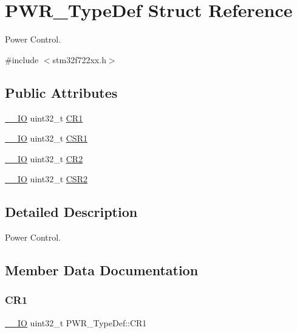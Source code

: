 \hypertarget{struct_p_w_r___type_def}{}\section{P\+W\+R\+\_\+\+Type\+Def Struct Reference}
\label{struct_p_w_r___type_def}


Power Control.  




{\ttfamily \#include $<$stm32f722xx.\+h$>$}

\subsection*{Public Attributes}
\begin{DoxyCompactItemize}
\item 
\mbox{\hyperlink{core__sc300_8h_aec43007d9998a0a0e01faede4133d6be}{\+\_\+\+\_\+\+IO}} uint32\+\_\+t \mbox{\hyperlink{struct_p_w_r___type_def_a50f96f92968bc5b9b40b870531dde182}{C\+R1}}
\item 
\mbox{\hyperlink{core__sc300_8h_aec43007d9998a0a0e01faede4133d6be}{\+\_\+\+\_\+\+IO}} uint32\+\_\+t \mbox{\hyperlink{struct_p_w_r___type_def_a682b6c3f4af70d7faf280b2e65b3d4a4}{C\+S\+R1}}
\item 
\mbox{\hyperlink{core__sc300_8h_aec43007d9998a0a0e01faede4133d6be}{\+\_\+\+\_\+\+IO}} uint32\+\_\+t \mbox{\hyperlink{struct_p_w_r___type_def_a8426bae04fc4cae7425f07c50f2359ec}{C\+R2}}
\item 
\mbox{\hyperlink{core__sc300_8h_aec43007d9998a0a0e01faede4133d6be}{\+\_\+\+\_\+\+IO}} uint32\+\_\+t \mbox{\hyperlink{struct_p_w_r___type_def_a714467a50d4e50d65d5a900ff87ba058}{C\+S\+R2}}
\end{DoxyCompactItemize}


\subsection{Detailed Description}
Power Control. 

\subsection{Member Data Documentation}
\mbox{\label{struct_p_w_r___type_def_a50f96f92968bc5b9b40b870531dde182}} 
\subsubsection{\texorpdfstring{CR1}{CR1}}
{\footnotesize\ttfamily \mbox{\hyperlink{core__sc300_8h_aec43007d9998a0a0e01faede4133d6be}{\+\_\+\+\_\+\+IO}} uint32\+\_\+t P\+W\+R\+\_\+\+Type\+Def\+::\+C\+R1}

